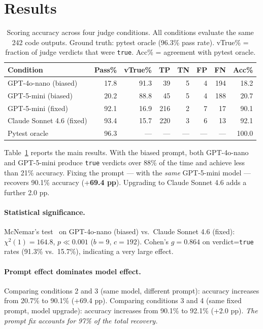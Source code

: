 \documentclass[11pt]{article}
\begin{document}
\section{Results}
\label{sec:results}

\begin{table}[t]
\centering
\caption{
  Scoring accuracy across four judge conditions.
  All conditions evaluate the same 242 code outputs.
  Ground truth: pytest oracle (96.3\% pass rate).
  vTrue\% = fraction of judge verdicts that were \texttt{true}.
  Acc\% = agreement with pytest oracle.
}
\label{tab:main}
\begin{tabular}{lrrrrrrr}
\toprule
Condition & Pass\% & vTrue\% & TP & TN & FP & FN & Acc\% \\
\midrule
GPT-4o-nano (biased)      & 17.8 & 91.3 &  39 &  5 &  4 & 194 & 18.2 \\
GPT-5-mini (biased)       & 20.2 & 88.8 &  45 &  5 &  4 & 188 & 20.7 \\
\midrule
GPT-5-mini (fixed)        & 92.1 & 16.9 & 216 &  2 &  7 &  17 & 90.1 \\
Claude Sonnet 4.6 (fixed) & 93.4 & 15.7 & 220 &  3 &  6 &  13 & 92.1 \\
\midrule
Pytest oracle             & 96.3 &   —  & —   &  — &  — &   — & 100.0 \\
\bottomrule
\end{tabular}
\end{table}

Table~\ref{tab:main} reports the main results.
With the biased prompt, both GPT-4o-nano and GPT-5-mini produce
\texttt{true} verdicts over 88\% of the time and achieve less than 21\%
accuracy.
Fixing the prompt --- with the \emph{same} GPT-5-mini model --- recovers
90.1\% accuracy (+\textbf{69.4 pp}).
Upgrading to Claude Sonnet 4.6 adds a further 2.0 pp.

\paragraph{Statistical significance.}
McNemar's test~\citep{mcnemar1947note} on GPT-4o-nano (biased) vs.\
Claude Sonnet 4.6 (fixed):
$\chi^2(1) = 164.8$, $p \ll 0.001$ ($b=9$, $c=192$).
Cohen's $g = 0.864$ on verdict=\texttt{true} rates
(91.3\% vs.\ 15.7\%), indicating a very large effect.

\paragraph{Prompt effect dominates model effect.}
Comparing conditions 2 and 3 (same model, different prompt):
accuracy increases from 20.7\% to 90.1\% (+69.4 pp).
Comparing conditions 3 and 4 (same fixed prompt, model upgrade):
accuracy increases from 90.1\% to 92.1\% (+2.0 pp).
\emph{The prompt fix accounts for 97\% of the total recovery.}
\end{document}
